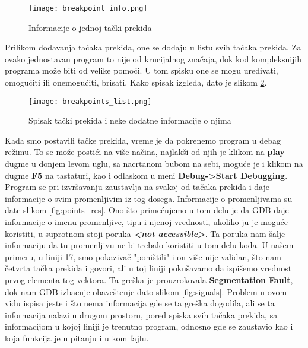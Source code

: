 \documentclass[a4paper]{article}
\begin{document}
\begin{figure}[h!]
\begin{center}
\texttt{[image: breakpoint\_info.png]}
\end{center}
\caption{Informacije o jednoj tački prekida}
\label{fig:point_info}
\end{figure}

Prilikom dodavanja tačaka prekida, one se dodaju u listu svih tačaka prekida. Za ovako jednostavan program to 
nije od krucijalnog značaja, dok kod kompleksnijih programa može biti od velike pomoći. U tom spisku one se mogu uređivati, 
omogućiti ili onemogućiti, brisati. Kako spisak izgleda, dato je slikom \ref{fig:points_list}.

\begin{figure}[h!]
\begin{center}
\texttt{[image: breakpoints\_list.png]}
\end{center}
\caption{Spisak tački prekida i neke dodatne informacije o njima}
\label{fig:points_list}
\end{figure}

Kada smo postavili tačke prekida, vreme je da pokrenemo program u debag režimu. To se može postići na više načina,
najlakši od njih je klikom na \textbf{play} dugme u donjem levom uglu, sa nacrtanom bubom na sebi, moguće je i klikom na 
dugme \textbf{F5} na tastaturi, kao i odlaskom u meni \textbf{Debug->Start Debugging}\cite{QT}.
\\

Program se pri izvršavanju zaustavlja na svakoj od tačaka prekida i daje informacije o svim promenljivim iz tog dosega. 
Informacije o promenljivama su date slikom \ref{fig:points_res}. 
Ono što primećujemo u tom delu je da GDB daje informacije o imenu promenljive, tipu i njenoj vrednosti, 
ukoliko ju je moguće koristiti, u suprotnom stoji poruka \textbf{\textit{<not accessible>}}. Ta poruka nam šalje
informaciju da tu promenljivu ne bi trebalo koristiti u tom delu koda. U našem primeru, u liniji 17, smo pokazivač "poništili" {} i 
on više nije validan, što nam četvrta tačka prekida i govori, ali u toj liniji pokušavamo da ispišemo vrednost prvog elementa
tog vektora. Ta greška je prouzrokovala \textbf{Segmentation Fault}, dok nam GDB izbacuje obaveštenje dato slikom \ref{fig:signals}.
Problem u ovom vidu ispisa jeste i što nema informacija gde se ta greška dogodila, ali se ta informacija nalazi u drugom prostoru, pored 
spiska svih tačaka prekida, sa informacijom u kojoj liniji je trenutno program, odnosno gde se zaustavio kao i koja funkcija je u pitanju i u kom fajlu.
\end{document}
